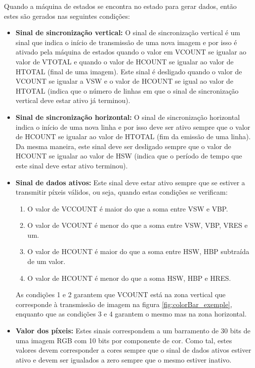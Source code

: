 Quando a máquina de estados se encontra no estado para gerar dados, então estes são gerados nas seguintes condições:
\begin{itemize}
	\item \textbf{Sinal de sincronização vertical:} O sinal de sincronização vertical é um sinal que indica o início de transmissão de uma nova imagem e por isso é ativado pela máquina de estados quando o valor em VCOUNT se igualar ao valor de VTOTAL e quando o valor de HCOUNT se igualar ao valor de HTOTAL (final de uma imagem). Este sinal é desligado quando o valor de VCOUNT se igualar a VSW e o valor de HCOUNT se igual ao valor de HTOTAL (indica que o número de linhas em que o sinal de sincronização vertical deve estar ativo já terminou).
	
	\item \textbf{Sinal de sincronização horizontal:} O sinal de sincronização horizontal indica o início de uma nova linha e por isso deve ser ativo sempre que o valor de HCOUNT se igualar ao valor de HTOTAL (fim da emissão de uma linha). Da mesma maneira, este sinal deve ser desligado sempre que o valor de HCOUNT se igualar ao valor de HSW (indica que o período de tempo que este sinal deve estar ativo terminou).
	
	\item \textbf{Sinal de dados ativos:} Este sinal deve estar ativo sempre que se estiver a transmitir píxeis válidos, ou seja, quando estas condições se verificam:
	\begin{enumerate}
		\item O valor de VCCOUNT é maior do que a soma entre VSW e VBP.
		\item O valor de VCOUNT é menor do que a soma entre VSW, VBP, VRES e um.
		\item O valor de HCOUNT é maior do que a soma entre HSW, HBP subtraída de um valor.
		\item O valor de HCOUNT é menor do que a soma HSW, HBP e HRES.
	\end{enumerate}

	As condições 1 e 2 garantem que VCOUNT está na zona vertical que corresponde à transmissão de imagem na figura \ref{fig:colorBar_exemple}, enquanto que as condições 3 e 4 garantem o mesmo mas na zona horizontal.
	
	\item \textbf{Valor dos píxeis:} Estes sinais correspondem a um barramento de 30 bits de uma imagem RGB com 10 bits por componente de cor. Como tal, estes valores devem corresponder a cores sempre que o sinal de dados ativos estiver ativo e devem ser igualados a zero sempre que o mesmo estiver inativo.
 
\end{itemize}

